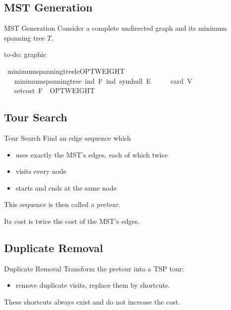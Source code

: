 \documentclass[%
	sans,
	12pt,
]{beamer}
\def\isacartoucheopen{}%
\def\isacartoucheclose{}%
\begin{document}
\subsection{MST Generation}
\begin{frame}{MST Generation}\pause
Consider a complete undirected graph and its minimum spanning tree $T$.\pause%


to-do: graphic
\begin{isabelle}
\isamarkupfalse%
\ minimum{\isacharunderscore}spanning{\isacharunderscore}tree{\isacharunderscore}le{\isacharunderscore}OPTWEIGHT{\isacharcolon}\isanewline
\ \ \ {\isacartoucheopen}minimum{\isacharunderscore}spanning{\isacharunderscore}tree\ {\isacharparenleft}ind\ F{\isacharparenright}\ {\isacharparenleft}ind\ {\isacharparenleft}symhull\ E{\isacharparenright}{\isacharparenright}{\isacartoucheclose}\isanewline
\ \ \ {\isacartoucheopen}{}\ {\isasymle}\ card\ V{\isacartoucheclose}\isanewline
\ \ \ {\isacartoucheopen}set{\isacharunderscore}cost\ F\ {\isasymle}\ OPTWEIGHT{\isacartoucheclose}
\end{isabelle}
\end{frame}

\subsection{Tour Search}
\begin{frame}{Tour Search}
Find an edge sequence which\pause
\begin{itemize}
	\item uses exactly the MST's edges, each of which twice\pause
	\item visits every node\pause
	\item starts and ends at the same node\pause
\end{itemize}
This sequence is then called a \textit{pretour}.\pause

Its cost is twice the cost of the MST's edges.
\end{frame}

\subsection{Duplicate Removal}
\begin{frame}{Duplicate Removal}
Transform the pretour into a TSP tour:
\begin{itemize}
	\item remove duplicate visits, replace them by shortcuts.
\end{itemize}
These shortcuts always exist and do not increase the cost. %
\end{frame}
\end{document}
